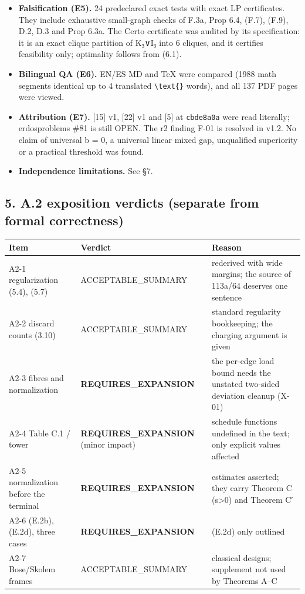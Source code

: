 \documentclass[
]{article}
\newcounter{none} %
\begin{document}
\begin{itemize}
  Classical.choice, Quot.sound\}, no \texttt{sorryAx} and no
  \texttt{Erdos81} root. The named Alon--Shapira removal lemmas are
  absent from the public Theorem C / C′ / 6.5 cones, but present in the
  cp-classification cone (X-27).
\item
  \textbf{Falsification (E5).} 24 predeclared exact tests with exact LP
  certificates. They include exhaustive small-graph checks of F.3a, Prop
  6.4, (F.7), (F.9), D.2, D.3 and Prop 6.3a. The Certo certificate was
  audited by its specification: it is an exact clique partition of K₃∨I₃
  into 6 cliques, and it certifies feasibility only; optimality follows
  from (6.1).
\item
  \textbf{Bilingual QA (E6).} EN/ES MD and TeX were compared (1988 math
  segments identical up to 4 translated
  \texttt{\textbackslash{}text\{\}} words), and all 137 PDF pages were
  viewed.
\item
  \textbf{Attribution (E7).} {[}15{]} v1, {[}22{]} v1 and {[}5{]} at
  \texttt{cbde8a0a} were read literally; erdosproblems \#81 is still
  OPEN. The r2 finding F-01 is resolved in v1.2. No claim of universal b
  = 0, a universal linear mixed gap, unqualified superiority or a
  practical threshold was found.
\item
  \textbf{Independence limitations.} See §7.
\end{itemize}

\subsection{5. A.2 exposition verdicts (separate from formal
correctness)}\label{5-a2-exposition-verdicts-separate-from-formal-correctness}

{\def\LTcaptype{none} %
\begin{longtable}[]{@{}lll@{}}
\toprule\noalign{}
Item & Verdict & Reason \\
\midrule\noalign{}
\endhead
\bottomrule\noalign{}
\endlastfoot
A2-1 regularization (5.4), (5.7) & ACCEPTABLE\_SUMMARY & rederived with
wide margins; the source of 113a/64 deserves one sentence \\
A2-2 discard counts (3.10) & ACCEPTABLE\_SUMMARY & standard regularity
bookkeeping; the charging argument is given \\
A2-3 fibres and normalization & \textbf{REQUIRES\_EXPANSION} & the
per-edge load bound needs the unstated two-sided deviation cleanup
(X-01) \\
A2-4 Table C.1 / tower & \textbf{REQUIRES\_EXPANSION} (minor impact) &
schedule functions undefined in the text; only explicit values
affected \\
A2-5 normalization before the terminal & \textbf{REQUIRES\_EXPANSION} &
estimates asserted; they carry Theorem C (s\textgreater0) and Theorem
C′ \\
A2-6 (E.2b), (E.2d), three cases & \textbf{REQUIRES\_EXPANSION} & (E.2d)
only outlined \\
A2-7 Bose/Skolem frames & ACCEPTABLE\_SUMMARY & classical designs;
supplement not used by Theorems A--C \\
\end{longtable}
}
\end{document}
